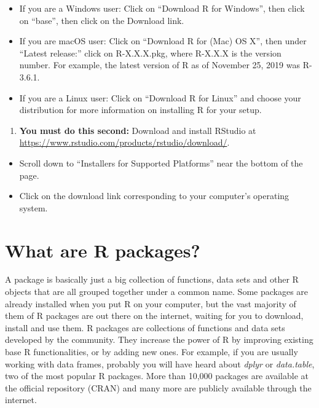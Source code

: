 \documentclass[
  12pt,
  oneside]{book}
\providecommand{\tightlist}{%
  \setlength{\itemsep}{0pt}\setlength{\parskip}{0pt}}
\begin{document}
\begin{itemize}
\tightlist
\item
  If you are a Windows user: Click on ``Download R for Windows'', then click on ``base'', then click on the Download link.
\item
  If you are macOS user: Click on ``Download R for (Mac) OS X'', then under ``Latest release:'' click on R-X.X.X.pkg, where R-X.X.X is the version number. For example, the latest version of R as of November 25, 2019 was R-3.6.1.
\item
  If you are a Linux user: Click on ``Download R for Linux'' and choose your distribution for more information on installing R for your setup.
\end{itemize}

\begin{enumerate}
\def\labelenumi{\arabic{enumi}.}
\tightlist
\item
  \textbf{You must do this second:} Download and install RStudio at \url{https://www.rstudio.com/products/rstudio/download/}.
\end{enumerate}

\begin{itemize}
\tightlist
\item
  Scroll down to ``Installers for Supported Platforms'' near the bottom of the page.
\item
  Click on the download link corresponding to your computer's operating system.
\end{itemize}

\hypertarget{packages}{%
\section{What are R packages?}\label{packages}}

A package is basically just a big collection of functions, data sets and other R objects that are all grouped together under a common name. Some packages are already installed when you put R on your computer, but the vast majority of them of R packages are out there on the internet, waiting for you to download, install and use them.
R packages are collections of functions and data sets developed by the community. They increase the power of R by improving existing base R functionalities, or by adding new ones. For example, if you are usually working with data frames, probably you will have heard about \emph{dplyr} or \emph{data.table}, two of the most popular R packages. More than 10,000 packages are available at the official repository (CRAN) and many more are publicly available through the internet.
\end{document}
